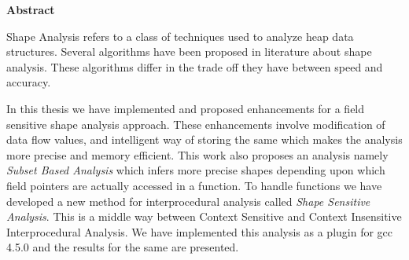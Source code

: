 \vspace*{1.0in}

\begin{center}
\begin{large}
{\bf Abstract}
\end{large}
\end{center}

Shape Analysis refers to a class of techniques used to analyze heap data structures. Several algorithms have been proposed in literature
about shape analysis. These algorithms differ in the trade off they have between speed and accuracy.
    
  In this thesis we have implemented and proposed enhancements for a field sensitive shape analysis approach. These enhancements involve modification of data flow values, and intelligent
way of storing the same which makes the analysis more precise and memory efficient. This work also proposes an analysis namely \emph{Subset Based Analysis}
which infers more precise shapes depending upon which field pointers are actually accessed in a function. To handle functions we have developed
a new method for interprocedural analysis called \emph{Shape Sensitive Analysis}. This is a middle way between Context Sensitive and Context Insensitive Interprocedural Analysis.
We have implemented this analysis as a plugin for gcc 4.5.0 and the results for the same are presented. 
